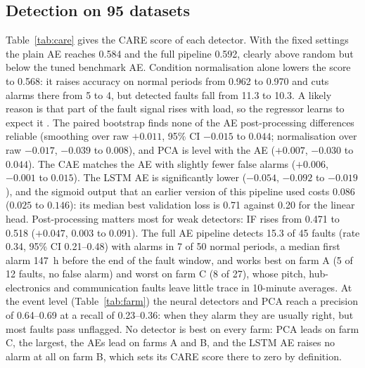 \documentclass[conference]{IEEEtran}
\begin{document}
\subsection{Detection on 95 datasets}
Table~\ref{tab:care} gives the CARE score of each detector. With the fixed settings the plain AE reaches 0.584 and the full pipeline 0.592, clearly above random but below the tuned benchmark AE. Condition normalisation alone lowers the score to 0.568: it raises accuracy on normal periods from 0.962 to 0.970 and cuts alarms there from 5 to 4, but detected faults fall from 11.3 to 10.3. A likely reason is that part of the fault signal rises with load, so the regressor learns to expect it \cite{r26}. The paired bootstrap finds none of the AE post-processing differences reliable (smoothing over raw $+0.011$, 95\% CI $-0.015$ to $0.044$; normalisation over raw $-0.017$, $-0.039$ to $0.008$), and PCA is level with the AE ($+0.007$, $-0.030$ to $0.044$). The CAE matches the AE with slightly fewer false alarms ($+0.006$, $-0.001$ to $0.015$). The LSTM AE is significantly lower ($-0.054$, $-0.092$ to $-0.019$), and the sigmoid output that an earlier version of this pipeline used costs $0.086$ ($0.025$ to $0.146$): its median best validation loss is 0.71 against 0.20 for the linear head. Post-processing matters most for weak detectors: IF rises from 0.471 to 0.518 ($+0.047$, $0.003$ to $0.091$). The full AE pipeline detects 15.3 of 45 faults (rate 0.34, 95\% CI 0.21--0.48) with alarms in 7 of 50 normal periods, a median first alarm 147~h before the end of the fault window, and works best on farm A (5 of 12 faults, no false alarm) and worst on farm C (8 of 27), whose pitch, hub-electronics and communication faults leave little trace in 10-minute averages. At the event level (Table~\ref{tab:farm}) the neural detectors and PCA reach a precision of 0.64--0.69 at a recall of 0.23--0.36: when they alarm they are usually right, but most faults pass unflagged. No detector is best on every farm: PCA leads on farm C, the largest, the AEs lead on farms A and B, and the LSTM AE raises no alarm at all on farm B, which sets its CARE score there to zero by definition.
\end{document}
